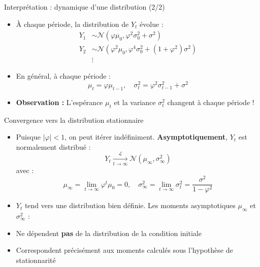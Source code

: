 \documentclass[11pt,aspectratio=169]{beamer}
\begin{document}
\begin{frame}{Interprétation : dynamique d'une distribution (2/2)}

\begin{itemize}

\item À chaque période, la distribution de $Y_t$ évolue :
\begin{align*}
Y_1 &\sim \mathcal{N}(\varphi \mu_0, \varphi^2 \sigma_0^2 + \sigma^2) \\
Y_2 &\sim \mathcal{N}(\varphi^2 \mu_0, \varphi^4 \sigma_0^2 + (1 + \varphi^2)\sigma^2) \\
&\vdots
\end{align*}

\item En général, à chaque période :
\[
\mu_t = \varphi \mu_{t-1}, \quad \sigma_t^2 = \varphi^2 \sigma_{t-1}^2 + \sigma^2
\]

\item \textbf{Observation :} L'espérance $\mu_t$ et la variance $\sigma_t^2$ changent à chaque période !

\end{itemize}
\end{frame}

\begin{frame}{Convergence vers la distribution stationnaire}

\begin{itemize}

\item Puisque $|\varphi| < 1$, on peut itérer indéfiniment. \textbf{Asymptotiquement}, $Y_t$ est normalement distribué :
\[
Y_t \xrightarrow[t \to \infty]{\mathcal{L}} \mathcal{N}(\mu_\infty, \sigma_\infty^2)
\]
avec :
\[
\mu_\infty = \lim_{t \to \infty} \varphi^t \mu_0 = 0, \quad \sigma_\infty^2 = \lim_{t \to \infty} \sigma_t^2 = \frac{\sigma^2}{1 - \varphi^2}
\]

\item $Y_t$ tend vers une distribution bien définie. Les moments asymptotiques $\mu_\infty$ et $\sigma_\infty^2$ :\newline

\item Ne dépendent \textbf{pas} de la distribution de la condition initiale\newline

\item Correspondent précisément aux moments calculés sous l'hypothèse de stationnarité

\end{itemize}
\end{frame}
\end{document}
